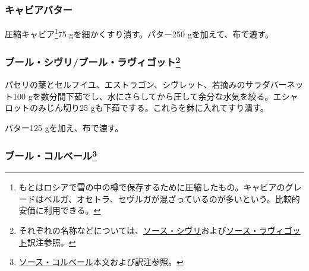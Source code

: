 \begin{recette}
\hypertarget{beurre-de-caviar}{%
\subsubsection{キャビアバター}\label{beurre-de-caviar}}



圧縮キャビア\footnote{もとはロシアで雪の中の樽で保存するために圧縮したもの。キャビアのグレードはベルガ、オセトラ、セヴルガが混ざっているのが多いという。比較的安価に利用できる。}75
gを細かくすり潰す。パター250 gを加えて、布で漉す。

\hypertarget{beurre-chivry}{%
\subsubsection[ブール・シヴリ/ブール・ラヴィゴット]{\texorpdfstring{ブール・シヴリ/ブール・ラヴィゴット\footnote{それぞれの名称などについては、\protect\hyperlink{sacue-chivry}{ソース・シヴリ}および\protect\hyperlink{sauce-ravigote}{ソース・ラヴィゴット}訳注参照。}}{ブール・シヴリ/ブール・ラヴィゴット}}\label{beurre-chivry}}



パセリの葉とセルフイユ、エストラゴン、シヴレット、若摘みのサラダバーネット100
gを数分間下茹でし、水にさらしてから圧して余分な水気を絞る。エシャロットのみじん切り25
gも下茹でする。これらを鉢に入れてすり潰す。

バター125 gを加え、布で漉す。

\hypertarget{beurre-colbert}{%
\subsubsection[ブール・コルベール]{\texorpdfstring{ブール・コルベール\footnote{\protect\hyperlink{sauce-colbert}{ソース・コルベール}本文および訳注参照。}}{ブール・コルベール}}\label{beurre-colbert}}


\end{recette}
